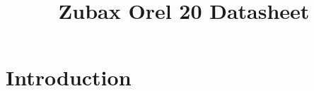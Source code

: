 \documentclass{zubaxdoc}
\title{Zubax Orel 20 Datasheet}
\begin{document}
\frontmatter

\begin{titlepage}
\BeginRightColumn
\end{titlepage}

\tableofcontents
\listoffigures
\listoftables

\mainmatter

\chapter{Introduction}
\end{document}
